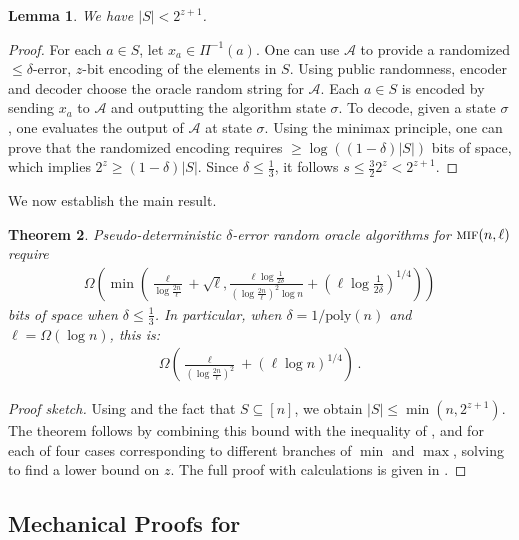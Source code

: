 \documentclass[10pt,a4paper]{article}
\newtheorem{theorem}{Theorem}[section]
\newtheorem{lemma}[theorem]{Lemma}
\theoremstyle{definition}
\theoremstyle{remark}
\newcommand{\cA}{\mathcal{A}}
\newcommand{\mif}{\textsc{mif}\xspace}
\newcommand{\poly}{\mathrm{poly}\xspace}
\newcommand{\rl}{\mathbf{\ell}}             %
\begin{document}
\begin{itemize}
\begin{itemize}
\begin{lemma}\label{lem:pd-s-le-2zp1}
  We have $|S| < 2^{z+1}$.
\end{lemma}
%
\begin{proof}%
  For each $a \in S$, let $x_a \in \Pi^{-1}(a)$. One can use $\cA$ to provide a randomized $\le\delta$-error, $z$-bit encoding of the elements in $S$. Using public randomness, encoder and decoder choose the oracle random string for $\cA$. Each $a \in S$ is encoded by sending $x_a$ to $\cA$ and outputting the algorithm state $\sigma$. To decode, given a state $\sigma$, one evaluates the output of $\cA$ at state $\sigma$. Using the minimax principle, one can prove that the randomized encoding requires $\ge \log( (1-\delta) |S| )$ bits of space, which implies $2^z \ge (1-\delta) |S|$. Since $\delta \le \frac{1}{3}$, it follows $s \le \frac{3}{2} 2^{z} < 2^{z+1}$.
\end{proof}

We now establish the main result.


\begin{theorem} %
\label{thm:pd-lb-intro}
  Pseudo-deterministic $\delta$-error random oracle algorithms for $\mif(n,\rl)$ require
  \begin{align*}
    \Omega\left(\min\left(\frac{\rl}{\log \frac{2n}{\rl}} + \sqrt{\rl}, \frac{\rl \log \frac{1}{2\delta}}{(\log \frac{2n}{\rl})^2 \log n} + \left(\rl \log \frac{1}{2\delta}\right)^{1/4}\right)\right)
  \end{align*}
  bits of space when $\delta \le \frac{1}{3}$. In particular, when $\delta = 1/\poly(n)$ and $\rl = \Omega(\log n)$, this is:
  \begin{align*}
    \Omega\left(\frac{\rl}{(\log\frac{2 n}{\rl})^2} + \left(\rl \log n\right)^{1/4}\right) \,.
  \end{align*}
\end{theorem}

\begin{proof}[Proof sketch]
  Using  and the fact that $S \subseteq [n]$, we obtain
  $|S| \le \min(n, 2^{z+1})$. The theorem follows by combining this bound with
  the inequality of , and for each of four cases
  corresponding to different branches of $\min$ and $\max$, solving to find a
  lower bound on $z$. The full proof with calculations is given in
  .
\end{proof}

\subsection{Mechanical Proofs for \texorpdfstring{}{Pseudo-Deterministic and Random Seed Lower Bounds}}\label{subsec:pd-lb-mech}



\end{itemize}
\end{itemize}
\end{document}
